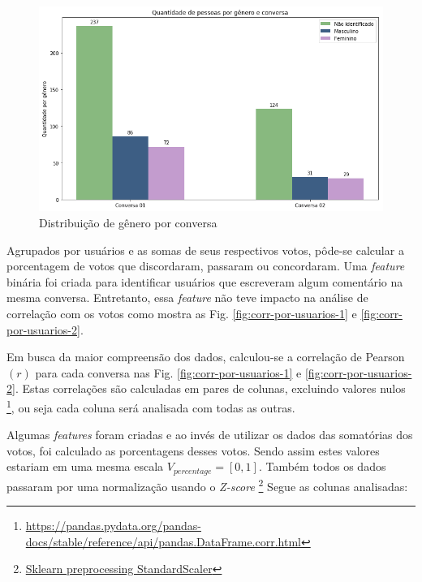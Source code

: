 \begin{figure}[!h]
	\centering
	\includegraphics[keepaspectratio=true,scale=0.5]{figuras/tcc2/genero_por_conversa.png}
	\caption{Distribuição de gênero por conversa}
	\label{fig:genero-por-conversa}
\end{figure}

Agrupados por usuários e as somas de seus respectivos votos, pôde-se calcular a porcentagem de votos que discordaram, passaram ou concordaram. 
Uma \textit{feature} binária foi criada para identificar usuários que escreveram algum comentário na mesma conversa. Entretanto, essa \textit{feature} não teve impacto na análise de correlação com os votos como mostra as Fig. \ref{fig:corr-por-usuarios-1} e \ref{fig:corr-por-usuarios-2}.


Em busca da maior compreensão dos dados, calculou-se a correlação de Pearson $(r)$ para cada conversa nas Fig. \ref{fig:corr-por-usuarios-1} e \ref{fig:corr-por-usuarios-2}. Estas correlações são calculadas em pares de colunas, excluindo valores 
nulos \footnote{\href{https://pandas.pydata.org/pandas-docs/stable/reference/api/pandas.DataFrame.corr.html}{https://pandas.pydata.org/pandas-docs/stable/reference/api/pandas.DataFrame.corr.html}}, ou seja cada coluna será analisada com todas as outras. 

Algumas \textit{features} foram criadas e ao invés de utilizar os dados das somatórias dos votos, foi calculado as porcentagens desses votos. 
Sendo assim estes valores estariam em uma mesma escala $V_{percentage}=[0,1]$. 
Também todos os dados passaram por uma normalização usando o \textit{Z-score} \footnote{\href{https://scikit-learn.org/stable/modules/generated/sklearn.preprocessing.StandardScaler.html\#sklearn.preprocessing.StandardScaler}{Sklearn preprocessing StandardScaler}}
Segue as colunas analisadas:


